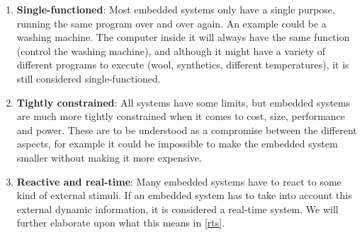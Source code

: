 \begin{enumerate}
  \item \textbf{Single-functioned}: Most embedded systems only have a single
  purpose, running the same program over and over again. An example could be a
  washing machine. The computer inside it will always have the same
  function (control the washing machine), and although it might have a variety
  of different programs to execute (wool, synthetics, different temperatures),
  it is still considered single-functioned.
  \item \textbf{Tightly constrained}: All systems have some limits, but embedded
  systems are much more tightly constrained when it comes to cost, size,
  performance and power. These are to be understood as a compromise between the
  different aspects, for example it could be impossible to make the embedded
  system smaller without making it more expensive.
  \item \textbf{Reactive and real-time}: Many embedded systems have to react to
  some kind of external stimuli. If an embedded system has to take into account
  this external dynamic information, it is considered a real-time system. We
  will further elaborate upon what this means in \autoref{rts}.
\end{enumerate}
